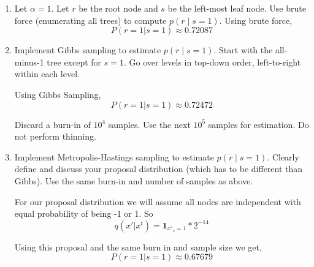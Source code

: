 \documentclass{article}
\begin{document}
\begin{enumerate}
\begin{enumerate}
  
  
  \item Let $\alpha=1$.  Let $r$ be the root node and $s$ be the left-most leaf node.
  Use brute force (enumerating all trees) to compute $p(r \mid s=1)$.
\color{blue}
Using brute force,
$$
P(r = 1 | s = 1) \approx 0.72087
$$
\color{black}  
  
  
  \item Implement Gibbs sampling to estimate $p(r \mid s=1)$.  Start with the all-minus-1 tree except for $s=1$.  Go over levels in top-down order, left-to-right within each level.
  
\color{blue}
Using Gibbs Sampling,
$$
P(r = 1 | s = 1) \approx 0.72472
$$
\color{black}  
  
  Discard a burn-in of $10^4$ samples.  Use the next $10^5$ samples for estimation.  Do not perform thinning.
  \item Implement Metropolis-Hastings sampling to estimate $p(r \mid s=1)$.  Clearly define and discuss your proposal distribution (which has to be different than Gibbs).  Use the same burn-in and number of samples as above.
  
\color{blue}
For our proposal distribution we will assume all nodes are independent with equal probability of being -1 or 1. So
$$
q(x' | x^t) = \mathbf{1}_{x'_s = 1} * 2^{-14}
$$

Using this proposal and the same burn in and sample size we get,
$$
P(r = 1 | s = 1) \approx 0.67679
$$

\color{black}  
 
  \end{enumerate}



\end{enumerate}
\end{document}
